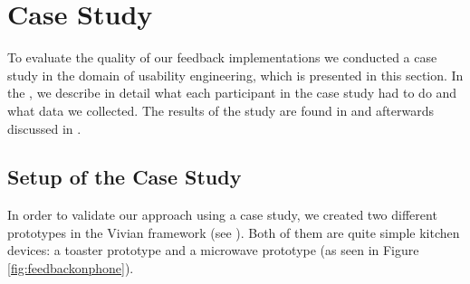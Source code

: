 \documentclass[11pt, a4paper]{article}
\begin{document}
	\section*{Case Study}\label{sec:casestudy}
		To evaluate the quality of our feedback implementations we conducted a case study in the domain of usability engineering, which is presented in this section. In the , we describe in detail what each participant in the case study had to do and what data we collected. The results of the study are found in  and afterwards discussed in .
		\subsection*{Setup of the Case Study}\label{ssec:setup}
			In order to validate our approach using a case study, we created two different prototypes in the Vivian framework (see ). Both of them are quite simple kitchen devices: a toaster prototype and a microwave prototype (as seen in Figure \ref{fig:feedbackonphone}).
\end{document}

